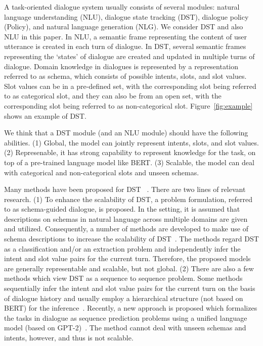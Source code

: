 \documentclass[11pt]{article}
\begin{document}
A task-oriented dialogue system usually consists of several modules: natural language understanding (NLU), dialogue state tracking (DST), dialogue policy (Policy), and natural language generation (NLG). We consider DST and also NLU in this paper. In NLU, a semantic frame representing the content of user utterance is created in each turn of dialogue. In DST, several semantic frames representing the `states' of dialogue are created and updated in multiple turns of dialogue. Domain knowledge in dialogues is represented by a representation referred to as schema, which consists of possible intents, slots, and slot values. Slot values can be in a pre-defined set, with the corresponding slot being referred to as categorical slot, and they can also be from an open set, with the corresponding slot being referred to as non-categorical slot. Figure~\ref{fig:example} shows an example of DST.

We think that a DST module (and an NLU module) should have the following abilities. (1) Global, the model can jointly represent intents, slots, and slot values. (2) Represenable, it has strong capability to represent knowledge for the task, on top of a pre-trained language model like BERT. (3) Scalable, the model can deal with categorical and non-categorical slots and unseen schemas. 

Many methods have been proposed for DST ~\citep{wu2019transferable,zhong2018global,mrkvsic2016neural,goo2018slot}. There are two lines of relevant research. (1) To enhance the 
scalability of DST, a problem formulation, referred to as schema-guided dialogue, is proposed.  In the setting, it is assumed that descriptions on schemas in natural language across multiple domains are given and utilized. Consequently, a number of methods are developed to make use of schema descriptions to increase the scalability of DST~\cite{rastogi2019towards, zang2020multiwoz, noroozi2020fast}. The methods regard DST as a classification and/or an extraction problem and independently infer the intent and slot value pairs for the current turn. Therefore, the proposed models are generally representable and scalable, but not global. 
(2) There are also a few methods which view DST as a sequence to sequence problem. Some methods sequentially infer the intent and slot value pairs for the current turn on the basis of dialogue history and usually employ a hierarchical structure (not based on BERT) for the inference~\cite{lei2018sequicity, ren2019scalable, chen2020credit}. Recently, a new approach is proposed which formalizes the tasks in dialogue as sequence prediction problems using a unified language model (based on GPT-2)~\citep{hosseini2020simple}. The method cannot deal with unseen schemas and intents, however, and thus is not scalable.
\end{document}
